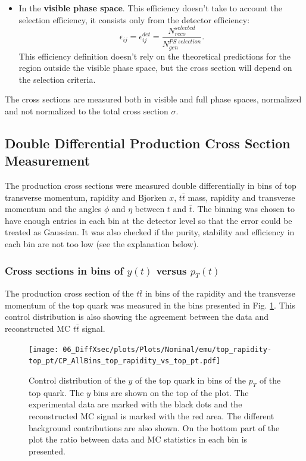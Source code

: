 \begin{itemize}
 \item In the \textbf{visible phase space}. This efficiency doesn't take to account the selection efficiency, it consists only from the detector efficiency:
 \begin{equation}
  \epsilon_{ij} = \epsilon_{ij}^{det} = \frac{N^{selected}_{reco}}{N^{PS\;selection}_{gen}}.
 \end{equation}
 This efficiency definition doesn't rely on the theoretical predictions for the region outside the visible phase space, but the cross section will depend on
 the selection criteria.
\end{itemize}

The cross sections are measured both in visible and full phase spaces, normalized and not normalized to the total cross section $\sigma$. 


\subsection{Double Differential Production Cross Section Measurement}

The production cross sections were measured double differentially in bins of top transverse momentum, rapidity and Bjorken $x$,
$t\bar{t}$ mass, rapidity and transverse momentum and the angles $\phi$ and $\eta$ between $t$ and $\bar{t}$.
The binning was chosen to have enough entries in each bin at the detector level so that the error could be treated as Gaussian.
It was also checked if the purity, stability and efficiency in each bin are not too low (see the explanation below).


\subsubsection{Cross sections in bins of $y(t)$ versus $p_{T}(t)$}

The production cross section of the $t\bar{t}$ in bins of the rapidity and the transverse momentum of the top quark was
measured in the bins presented in Fig. \ref{fig:CP_2D_y_pt}. This control distribution is also showing the agreement between 
the data and reconstructed MC $t\bar{t}$ signal.

\begin{figure}[t]
  \centering
  \texttt{[image: 06\_DiffXsec/plots/Plots/Nominal/emu/top\_rapidity-top\_pt/CP\_AllBins\_top\_rapidity\_vs\_top\_pt.pdf]}
  \caption{Control distribution of the $y$ of the top quark in bins of the $p_{T}$ of the top quark. The $y$ bins are shown on the top 
  of the plot. The experimental data are marked with the black dots and the reconstructed MC signal is marked with the red area. The 
  different background contributions are also shown. On the bottom part of the plot the ratio between data and MC statistics in each bin
  is presented.}
  \label{fig:CP_2D_y_pt}
\end{figure}

